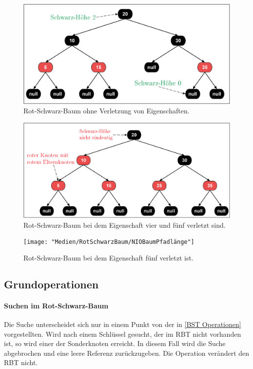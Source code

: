 \documentclass[a4paper,12pt]{article}
\begin{document}
\begin{figure}[h]
	\centering
	\includegraphics[width= 1\textwidth]{"Medien/RotSchwarzBaum/IOBaum"}
	\caption{Rot-Schwarz-Baum ohne Verletzung von Eigenschaften. }
	\label{fig:IOBaum}
\end{figure}
\begin{figure}[h]
	\centering
	\includegraphics[width= 1\textwidth]{"Medien/RotSchwarzBaum/NIOBaumZweiRote"}
	\caption{Rot-Schwarz-Baum bei dem Eigenschaft vier und fünf verletzt sind. }
	\label{fig:NIOBaumZweiRote}
\end{figure}
\begin{figure}[h]
	\centering
	\texttt{[image: "Medien/RotSchwarzBaum/NIOBaumPfadlänge"]}
	\caption{Rot-Schwarz-Baum bei dem Eigenschaft fünf verletzt ist.  }
	\label{fig:NIOBaumPfadlänge}
\end{figure}
\subsection{Grundoperationen}
\paragraph{Suchen im Rot-Schwarz-Baum}
Die Suche unterscheidet sich nur in einem Punkt von der in \ref{BST Operationen} vorgestellten. Wird nach einem Schlüssel gesucht, der im RBT nicht vorhanden ist, so wird einer der Sonderknoten erreicht. In diesem Fall wird die Suche abgebrochen und eine leere Referenz zurückzugeben. Die Operation verändert den RBT nicht. 
\end{document}
